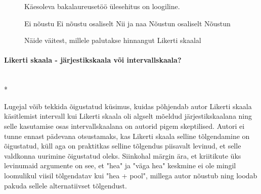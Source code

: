 \documentclass[a4paper]{article}
\begin{document}
\vspace{10pt}

\begin{figure}[H]


\colorbox{background_example}{\parbox{\textwidth}{

\vspace{1mm}

Käesoleva bakalaureusetöö \"ulesehitus on loogiline.

\vspace{5pt}

\begin{Form}
\def\DefaultWidthofChoiceMenu{12pt}%



\ChoiceMenu[bordercolor = gray,disabled = true,name=optionE,radio,radiosymbol=\ding{108}]{\mbox{}}\null Ei nõustu 
\ChoiceMenu[bordercolor = gray,disabled = true,name=optionD,radio,radiosymbol=\ding{108}]{\mbox{}}\null Ei nõustu osaliselt
\ChoiceMenu[bordercolor = gray,disabled = true,name=optionC,radio,radiosymbol=\ding{108}]{\mbox{}}\null Nii ja naa
\ChoiceMenu[bordercolor = gray,disabled = true, name=optionB,radio,radiosymbol=\ding{108}]{\mbox{}}\null Nõustun osaliselt
\ChoiceMenu[bordercolor = gray,disabled = true,name=optionA,radio,radiosymbol=\ding{108}]{\mbox{}}\null Nõustun


\end{Form}}}
\caption{Näide väitest, millele palutakse hinnangut Likerti skaalal}
\label{likert_question}
\end{figure}

\paragraph{Likerti skaala -  järjestikskaala või intervallskaala?}\mbox{}\\*

Lugejal võib tekkida õigustatud k\"usimus, kuidas põhjendab autor Likerti skaala käsitlemist intervall kui Likerti skaala oli algselt mõeldud järjestikskaalana ning  selle kasutamise osas intervallskaalana on autorid pigem skeptilised. \cite{Jamieson2004} Autori ei tunne ennast pädevana otsustamaks, kas Likerti skaala selline tõlgendamine on õigustatud, k\"ull aga on praktitkas selline tõlgendus piisavalt levinud, et selle valdkonna uurimine õigustatud oleks. Siinkohal märgin ära, et kriitikute \"uks levinumaid argumente on see, et "hea" ja "väga hea" keskmine ei ole mingil loomulikul viisil tõlgendatav kui  "hea + pool", millega autor nõustub ning loodab pakuda sellele alternatiivset tõlgendust. 
\end{document}
